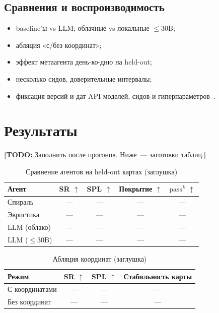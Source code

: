 \documentclass[11pt,a4paper]{article}
\newcommand{\todo}[1]{\textcolor{red!70!black}{\textbf{[TODO:} #1\textbf{]}}}
\begin{document}
\subsection{Сравнения и воспроизводимость}

\begin{itemize}[leftmargin=*]
  \item baseline'ы vs LLM; облачные vs локальные \(\le 30\mathrm{B}\);
  \item абляция «с/без координат»;
  \item эффект метаагента день-ко-дню на held-out;
  \item несколько сидов, доверительные интервалы;
  \item фиксация версий и дат API-моделей, сидов и гиперпараметров~\cite{pineau2018reproducibility}.
\end{itemize}

\section{Результаты}
\label{sec:results}

\todo{Заполнить после прогонов. Ниже~--- заготовки таблиц.}

\begin{table}[ht]
\centering
\caption{Сравнение агентов на held-out картах (заглушка)}
\label{tab:main}
\begin{tabular}{lcccc}
\toprule
Агент & SR \(\uparrow\) & SPL \(\uparrow\) & Покрытие \(\uparrow\) & \(\mathrm{pass}^k\) \(\uparrow\) \\
\midrule
Спираль & --- & --- & --- & --- \\
Эвристика & --- & --- & --- & --- \\
LLM (облако) & --- & --- & --- & --- \\
LLM (\(\le 30\mathrm{B}\)) & --- & --- & --- & --- \\
\bottomrule
\end{tabular}
\end{table}

\begin{table}[ht]
\centering
\caption{Абляция координат (заглушка)}
\label{tab:ablation}
\begin{tabular}{lccc}
\toprule
Режим & SR \(\uparrow\) & SPL \(\uparrow\) & Стабильность карты \\
\midrule
С координатами & --- & --- & --- \\
Без координат & --- & --- & --- \\
\bottomrule
\end{tabular}
\end{table}
\end{document}
